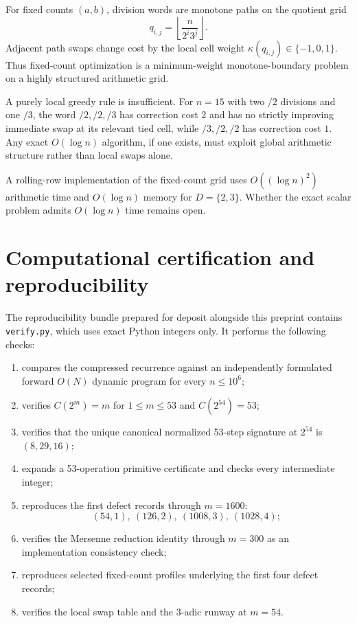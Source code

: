 \documentclass[11pt]{article}
\begin{document}
For fixed counts $(a,b)$, division words are monotone paths on the quotient grid
\[
 q_{i,j}=\left\lfloor\frac{n}{2^i3^j}\right\rfloor.
\]
Adjacent path swaps change cost by the local cell weight $\kappa(q_{i,j})\in\{-1,0,1\}$. Thus fixed-count optimization is a minimum-weight monotone-boundary problem on a highly structured arithmetic grid.

A purely local greedy rule is insufficient. For $n=15$ with two $/2$ divisions and one $/3$, the word $/2,/2,/3$ has correction cost $2$ and has no strictly improving immediate swap at its relevant tied cell, while $/3,/2,/2$ has correction cost $1$. Any exact $O(\log n)$ algorithm, if one exists, must exploit global arithmetic structure rather than local swaps alone.

A rolling-row implementation of the fixed-count grid uses $O((\log n)^2)$ arithmetic time and $O(\log n)$ memory for $D=\{2,3\}$. Whether the exact scalar problem admits $O(\log n)$ time remains open.

\section{Computational certification and reproducibility}
The reproducibility bundle prepared for deposit alongside this preprint contains \texttt{verify.py}, which uses exact Python integers only. It performs the following checks:
\begin{enumerate}
\item compares the compressed recurrence against an independently formulated forward $O(N)$ dynamic program for every $n\le10^6$;
\item verifies $C(2^m)=m$ for $1\le m\le53$ and $C(2^{54})=53$;
\item verifies that the unique canonical normalized 53-step signature at $2^{54}$ is $(8,29,16)$;
\item expands a 53-operation primitive certificate and checks every intermediate integer;
\item reproduces the first defect records through $m=1600$:
\[
 (54,1),\ (126,2),\ (1008,3),\ (1028,4);
\]
\item verifies the Mersenne reduction identity through $m=300$ as an implementation consistency check;
\item reproduces selected fixed-count profiles underlying the first four defect records;
\item verifies the local swap table and the $3$-adic runway at $m=54$.
\end{enumerate}
\end{document}
